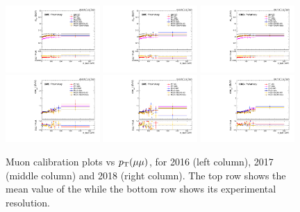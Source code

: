 \begin{figure}[!htb]
      \centering
      \captionsetup{justification=justified}
      \includegraphics[width=0.32\textwidth]{pics/muon_corr/muon_cal/2016/dimu_pt_summary_mean.pdf}
      \includegraphics[width=0.32\textwidth]{pics/muon_corr/muon_cal/2017/dimu_pt_summary_mean.pdf}
      \includegraphics[width=0.32\textwidth]{pics/muon_corr/muon_cal/2018/dimu_pt_summary_mean.pdf}
      \includegraphics[width=0.32\textwidth]{pics/muon_corr/muon_cal/2016/dimu_pt_summary_reso.pdf}
      \includegraphics[width=0.32\textwidth]{pics/muon_corr/muon_cal/2017/dimu_pt_summary_reso.pdf}
      \includegraphics[width=0.32\textwidth]{pics/muon_corr/muon_cal/2018/dimu_pt_summary_reso.pdf}
      \caption{Muon calibration plots vs $p_{\mathrm{T}}(\mu\mu)$, for 2016 (left column), 2017 (middle column) and 2018 (right column).
               The top row shows the mean value of the \mmm while the bottom row shows its experimental resolution.}
      \label{fig:mucal_dimu_pt}
\end{figure}


